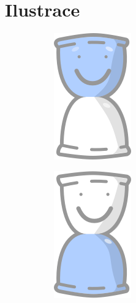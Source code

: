 \documentclass[twoside]{ctuthesis}
\begin{document}
\section{Ilustrace}\label{ilu}
\begin{figure}[h]
	\centering
	\begin{subfigure}[b]{.24\textwidth}
		\centering
		\includegraphics[width=.6\linewidth]{img/il-upcoming.png}
		\label{fig:il-upcoming}
	\end{subfigure}%
	\begin{subfigure}[b]{.24\textwidth}
		\centering
		\includegraphics[width=.6\linewidth]{img/il-history.png}

\end{subfigure}
\end{figure}
\end{document}
